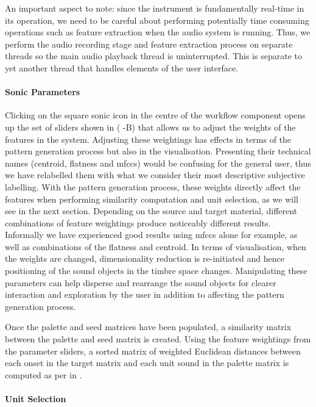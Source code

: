 An important aspect to note: since the instrument is fundamentally real-time in its operation, we need to be careful about performing potentially time consuming operations such as feature extraction when the audio system is running. Thus, we perform the audio recording stage and feature extraction process on separate threads so the main audio playback thread is uninterrupted. This is separate to yet another thread that handles elements of the user interface.

\paragraph{Sonic Parameters}

Clicking on the square sonic icon in the centre of the workflow component opens up the set of sliders shown in ( -B) that allows us to adjust the weights of the features in the system. Adjusting these weightings has effects in terms of the pattern generation process but also in the visualisation. Presenting their technical names (centroid, flatness and \acrshort{mfcc}s) would be confusing for the general user, thus we have relabelled them with what we consider their most descriptive subjective labelling. With the pattern generation process, these weights directly affect the features when performing similarity computation and unit selection, as we will see in the next section. Depending on the source and target material, different combinations of feature weightings produce noticeably different results. Informally we have experienced good results using \acrshort{mfcc}s alone for example, as well as combinations of the flatness and centroid. In terms of visualisation, when the weights are changed, dimensionality reduction is re-initiated and hence positioning of the sound objects in the timbre space changes. Manipulating these parameters can help disperse and rearrange the sound objects for clearer interaction and exploration by the user in addition to affecting the pattern generation process.

Once the palette and seed matrices have been populated, a similarity matrix between the palette and seed matrix is created. Using the feature weightings from the parameter sliders, a sorted matrix of weighted Euclidean distances between each onset in the target matrix and each unit sound in the palette matrix is computed as per  in .

\paragraph{Unit Selection}

